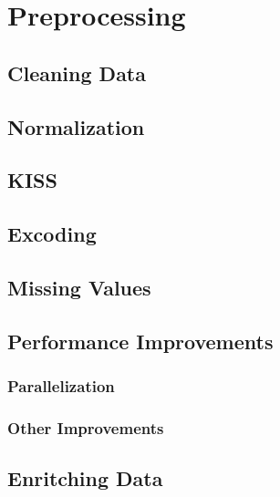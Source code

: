 \chapter{Preprocessing}
\label{chap:Preprocessing}

\section{Cleaning Data}
\label{sec:Cleaning Data}

\section{Normalization}
\label{sec:Normalization}

\section{KISS}
\label{sec:KISS}

\section{Excoding}
\label{sec:Excoding}

\section{Missing Values}
\label{sec:Missing Values}

\section{Performance Improvements}
\label{sec:Performance Improvements}

\subsection{Parallelization}
\label{sub:Parallelization}

\subsection{Other Improvements}
\label{sub:Other Improvements}

\section{Enritching Data}
\label{sec:Enritching Data}
